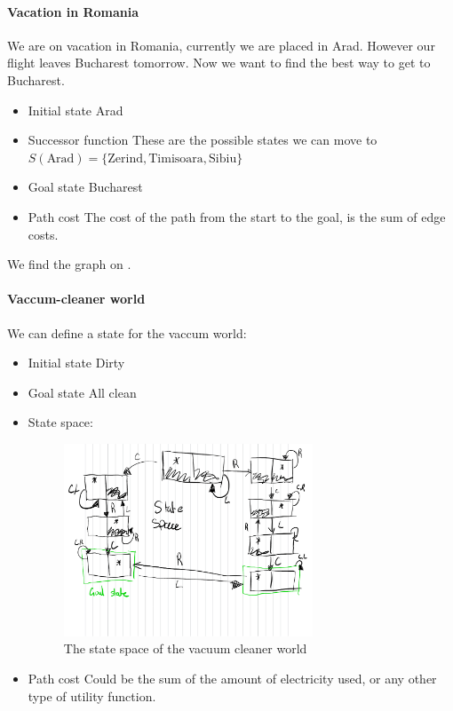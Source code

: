 \documentclass{article}
\begin{document}
\paragraph{Vacation in Romania} 
We are on vacation in Romania, currently we are placed in Arad. However our flight
leaves Bucharest tomorrow. Now we want to find the best way to get to Bucharest.

\begin{itemize}[noitemsep]
  \item Initial state
    \subitem Arad
  \item Successor function 
    \subitem These are the possible states we can move to $S(\text{Arad}) = \{\text{Zerind}, \text{Timisoara}, \text{Sibiu}\}$
  \item Goal state
    \subitem Bucharest
  \item Path cost
    \subitem The cost of the path from the start to the goal, is the sum of edge
    costs.
\end{itemize}

We find the graph on \cite[p. 9]{presentation:solving_problems_by_searching}.

\paragraph{Vaccum-cleaner world}
We can define a state for the vaccum world:
\begin{itemize}[noitemsep]
  \item Initial state 
    \subitem Dirty
  \item Goal state
    \subitem All clean
  \item State space:
    \subitem 
    \begin{figure}[H]
      \center
      \includegraphics[width=0.7\textwidth]{./statespace.pdf}
      \caption{The state space of the vacuum cleaner world}
    \end{figure}
  \item Path cost
    \subitem Could be the sum of the amount of electricity used, or any other
    type of utility function.
\end{itemize}
\end{document}
